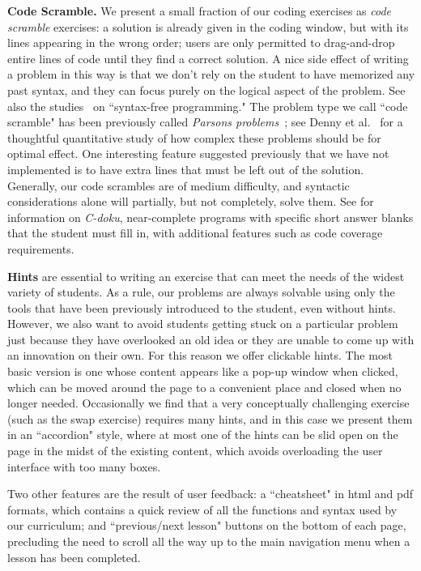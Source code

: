\documentclass{article}
\begin{document}
{{\bf Code Scramble.} We present a small fraction of our coding exercises as \emph{code scramble} exercises: a solution is already given in the coding window, but with its lines appearing in the wrong order; users are only permitted to drag-and-drop entire lines of code until they find  a correct solution. A nice side effect of writing a problem in this way is that we don't rely on the student to have memorized any past syntax, and they can focus purely on the logical aspect of the problem. See also the studies~\cite{LWRL08,FT09} on ``syntax-free programming."
The problem type we call ``code scramble" has been previously called \emph{Parsons problems}~\cite{PH06}; see Denny et al.~\cite{DLRS08} for a thoughtful quantitative study of how complex these problems should be for optimal effect. One interesting feature suggested previously that we have not implemented is to have extra lines that must be left out of the solution. Generally, our code scrambles are of medium difficulty, and syntactic considerations alone will partially, but not completely, solve them.
See \cite{HLP11} for information on \emph{C-doku}, near-complete programs with specific short answer blanks that the student must fill in, with additional features such as code coverage requirements.

{\bf Hints} are essential to writing an exercise that can meet the needs of the widest variety of students. As a rule, our problems are always solvable using only the tools that have been previously introduced to the student, even without hints. However, we also want to avoid students getting stuck on a particular problem just because they have overlooked an old idea or they are unable to come up with an innovation on their own. For this reason we offer clickable hints. The most basic version is one whose content appears like a pop-up window when clicked, which can be moved around the page to a convenient place and closed when no longer needed. Occasionally we find that a very conceptually challenging exercise (such as the swap exercise) requires many hints, and in this case we present them in an ``accordion" style, where at most one of the hints can be slid open on the page in the midst of the existing content, which avoids overloading the user interface with too many boxes.

Two other features are the result of user feedback: a ``cheatsheet" in html and pdf formats, which contains a quick review of all the functions and syntax used by our curriculum; and ``previous/next lesson" buttons on the bottom of each page, precluding the need to scroll all the way up to the main navigation menu when a lesson has been completed.

}
\end{document}
